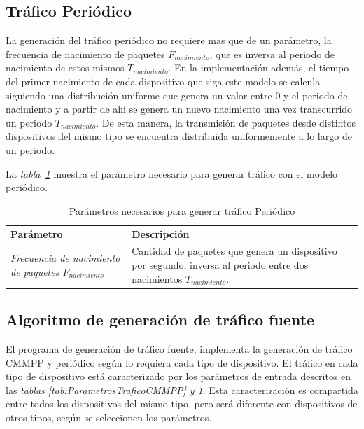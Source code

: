 \subsection{Tráfico Periódico}

La generación del tráfico periódico no requiere mas que de un parámetro, la frecuencia de nacimiento de paquetes $F_{nacimiento}$, que es inversa al periodo de nacimiento de estos mismos $T_{nacimiento}$. En la implementación además, el tiempo del primer nacimiento de cada dispositivo que siga este modelo se calcula siguiendo una distribución uniforme que genera un valor entre 0 y el periodo de nacimiento y a partir de ahí se genera un nuevo nacimiento una vez transcurrido un periodo $T_{nacimiento}$. De esta manera, la transmisión de paquetes desde distintos dispositivos del mismo tipo se encuentra distribuida uniformemente a lo largo de un periodo.\newline

La \textit{tabla~\ref{tab:ParametrosTraficoPeriodico}} muestra el parámetro necesario para generar tráfico con el modelo periódico.\newline

\begin{table}
    \caption{Parámetros necesarios para generar tráfico Periódico}
    \label{tab:ParametrosTraficoPeriodico}
    \centering
    \begin{tabular}{|m{6cm}|p{10cm}|} \\ 
    \textbf{Parámetro} & \textbf{Descripción} \\ 
    \textit{Frecuencia de nacimiento de paquetes $F_{nacimiento}$}  & \footnotesize{ Cantidad de paquetes que genera un dispositivo por segundo, inversa al periodo entre dos nacimientos $T_{nacimiento}$. } \\ \hline 
 
    \end{tabular}
\end{table}

\subsection{Algoritmo de generación de tráfico fuente}

El programa de generación de tráfico fuente, implementa la generación de tráfico CMMPP y periódico según lo requiera cada tipo de dispositivo. El tráfico en cada tipo de dispositivo está caracterizado por los parámetros de entrada descritos en las \textit{tablas \ref{tab:ParametrosTraficoCMMPP} y \ref{tab:ParametrosTraficoPeriodico}}. Esta caracterización es compartida entre todos los dispositivos del mismo tipo, pero será diferente con dispositivos de otros tipos, según se seleccionen los parámetros.\newline

